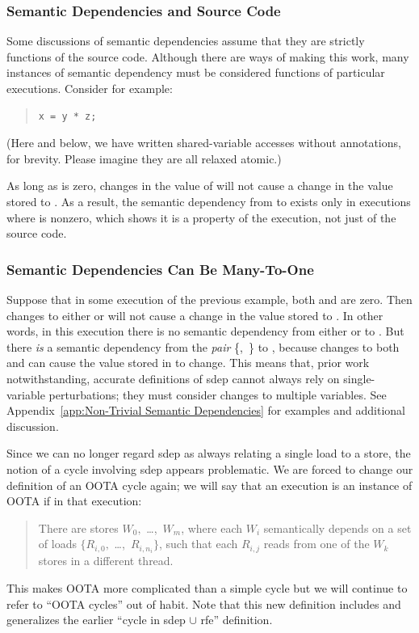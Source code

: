 \documentclass[10]{article}
\begin{document}
\subsubsection{Semantic Dependencies and Source Code}
\label{sec:Semantic Dependencies and Source Code}

Some discussions of semantic dependencies assume that they
are strictly functions of the source code.
Although there are ways of making this work, many instances of
semantic dependency must be considered functions of particular executions.
Consider for example:
\begin{quote}
\begin{verbatim}
x = y * z;
\end{verbatim}
\end{quote}
(Here and below, we have written shared-variable accesses without
annotations, for brevity.  Please imagine they are all relaxed atomic.)

As long as  is zero, changes in the
value of  will not cause a change in the value stored to .
As a result, the semantic dependency from  to  exists only
in executions where  is nonzero,
which shows it is a property of the execution, not just of the source code.

\subsubsection{Semantic Dependencies Can Be Many-To-One}
\label{sec:Semantic Dependencies Can Be Many-To-One}

Suppose that in some execution of the previous example,
both  and  are zero.
Then changes to either  or 
will not cause a change in the value stored to .
In other words, in this execution there is no semantic dependency
from either  or  to .
But there \emph{is} a semantic dependency from the \emph{pair}
\{,~\} to ,
because changes to both  and 
can cause the value stored in  to change.
This means that, prior work~\cite{PaulEMcKenney2016OOTA}
notwithstanding, accurate definitions of sdep cannot always rely on
single-variable perturbations;
they must consider changes to multiple variables.
See Appendix~\ref{app:Non-Trivial Semantic Dependencies}
for examples and additional discussion.

Since we can no longer regard sdep as always relating a single load to a store,
the notion of a cycle involving sdep appears problematic.
We are forced to change our definition of an OOTA cycle again;
we will say that an execution is an instance of OOTA if in that execution:
\begin{quote}
	There are stores $W_0,$ \ldots,~$W_m$,
	where each $W_i$ semantically depends on a set of loads
	$\{R_{i,0},$ \ldots,~$R_{i,n_i}\}$,
	such that each $R_{i,j}$ reads from one of the $W_k$
	stores in a different thread.
\end{quote}
This makes OOTA more complicated than a simple cycle but
we will continue to refer to ``OOTA cycles'' out of habit.
Note that this new definition includes and generalizes the earlier
``cycle in sdep $\cup$ rfe'' definition.
\end{document}
